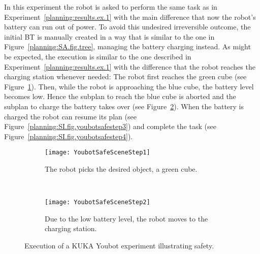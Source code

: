 {\begin{experiment}[Safety]
In this experiment the robot is asked to perform the same task as in Experiment~\ref{planning:results.ex.1} with the main difference that now the robot's battery can run out of power. To avoid this undesired irreversible outcome, the initial BT is manually created  in a way that is similar to the one in Figure~\ref{planning:SA.fig.tree}, managing the battery charging instead. As might be expected, the execution  is similar to the one described in Experiment~\ref{planning:results.ex.1} with the difference that the robot reaches the charging station whenever needed: The robot first reaches the green cube (see Figure~\ref{planning:SI.fig.youbotsafestep1}). Then, while the robot is approaching the blue cube, the battery level becomes low. Hence the subplan to reach the blue cube is aborted and the subplan to charge the battery takes over (see Figure~\ref{planning:SI.fig.youbotsafestep2}). When the battery is charged the robot can resume its plan (see Figure~\ref{planning:SI.fig.youbotsafestep3}) and complete the task (see Figure~\ref{planning:SI.fig.youbotsafestep4}).
\end{experiment}
\begin{figure}[h]
        \centering
        \begin{subfigure}[b]{	0.9\columnwidth}
                \centering
                \texttt{[image: YoubotSafeSceneStep1]}%
                \caption{The robot picks the desired object, a green cube. }
                \label{planning:SI.fig.youbotsafestep1}              
        \end{subfigure}       
        ~         
        \begin{subfigure}[b]{0.9\columnwidth}
                \centering
                \texttt{[image: YoubotSafeSceneStep2]}
                \caption{Due to the low battery level, the robot moves to the charging station.}
 			\label{planning:SI.fig.youbotsafestep2}  
         \end{subfigure}
                 \caption{Execution of a KUKA Youbot  experiment illustrating safety.}
        \label{planning:SI.fig.yousafescreen}
\end{figure}
\clearpage

}
